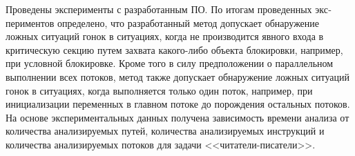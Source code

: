 Проведены эксперименты с разработанным ПО. По итогам проведенных экс­периментов определено, что разработанный метод допускает обнаружение ложных ситуаций гонок в ситуациях, когда не производится явного входа в крити­ческую секцию путем захвата какого-либо объекта блокировки, например, при условной блокировке. Кроме того в силу предположении о параллельном выполнении всех потоков, метод также допускает обнаружение ложных ситуаций гонок в ситуациях, когда выполняется только один поток, например, при инициализации переменных в главном потоке до порождения остальных потоков. На основе экспериментальных данных получена зависимость времени анализа от количества анализируемых путей, количества анализируемых инструкций и количества анализируемых потоков для задачи <<читатели-писатели>>.
